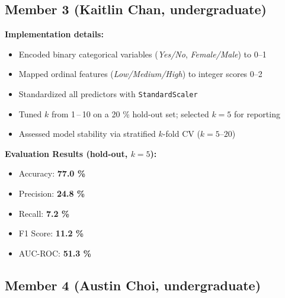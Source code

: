 \documentclass[11pt,a4paper]{article}
\begin{document}
\subsection{Member 3 (Kaitlin Chan, undergraduate)}
\begin{tcolorbox}[%
        title=K-Nearest Neighbors Classification,
        colback=lightgreen!30,
        colframe=darkgreen,
        boxrule=0.5pt,
        fonttitle=\bfseries\sffamily\footnotesize,
        fontupper=\footnotesize
    ]
    \textbf{Implementation details:}
    \begin{itemize}[leftmargin=*, itemsep=2pt, parsep=0pt]
        \item Encoded binary categorical variables (\textit{Yes/No}, \textit{Female/Male}) to  \numrange{0}{1}
        \item Mapped ordinal features (\textit{Low/Medium/High}) to integer scores \numrange{0}{2}
        \item Standardized all predictors with \texttt{StandardScaler}
        \item Tuned $k$ from 1\,–\,10 on a 20 \% hold-out set; selected $k\!=\!5$ for reporting
        \item Assessed model stability via stratified $k$-fold CV ($k\!=\!5\text{–}20$)
    \end{itemize}

    \textbf{Evaluation Results (hold-out, $k=5$):}
    \begin{itemize}[leftmargin=*, itemsep=2pt, parsep=0pt]
        \item Accuracy: \textbf{77.0 \%}
        \item Precision: \textbf{24.8 \%}
        \item Recall: \textbf{7.2 \%}
        \item F1 Score: \textbf{11.2 \%}
        \item AUC-ROC: \textbf{51.3 \%}
    \end{itemize}
\end{tcolorbox}


\subsection{Member 4 (Austin Choi, undergraduate)}
\end{document}
